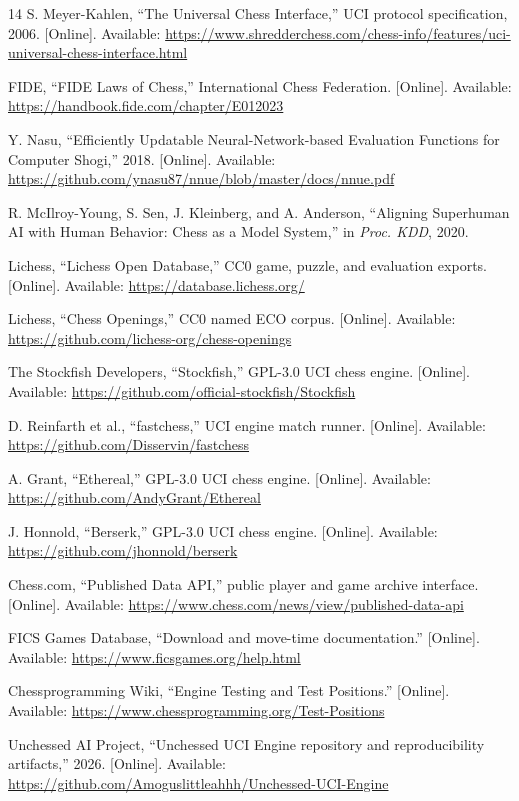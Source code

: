 \documentclass[conference]{IEEEtranSSP}
\begin{document}
\begin{thebibliography}{14}
S. Meyer-Kahlen, ``The Universal Chess Interface,'' UCI protocol specification, 2006. [Online]. Available: \url{https://www.shredderchess.com/chess-info/features/uci-universal-chess-interface.html}

FIDE, ``FIDE Laws of Chess,'' International Chess Federation. [Online]. Available: \url{https://handbook.fide.com/chapter/E012023}

Y. Nasu, ``Efficiently Updatable Neural-Network-based Evaluation Functions for Computer Shogi,'' 2018. [Online]. Available: \url{https://github.com/ynasu87/nnue/blob/master/docs/nnue.pdf}

R. McIlroy-Young, S. Sen, J. Kleinberg, and A. Anderson, ``Aligning Superhuman AI with Human Behavior: Chess as a Model System,'' in \emph{Proc. KDD}, 2020.

Lichess, ``Lichess Open Database,'' CC0 game, puzzle, and evaluation exports. [Online]. Available: \url{https://database.lichess.org/}

Lichess, ``Chess Openings,'' CC0 named ECO corpus. [Online]. Available: \url{https://github.com/lichess-org/chess-openings}

The Stockfish Developers, ``Stockfish,'' GPL-3.0 UCI chess engine. [Online]. Available: \url{https://github.com/official-stockfish/Stockfish}

D. Reinfarth et al., ``fastchess,'' UCI engine match runner. [Online]. Available: \url{https://github.com/Disservin/fastchess}

A. Grant, ``Ethereal,'' GPL-3.0 UCI chess engine. [Online]. Available: \url{https://github.com/AndyGrant/Ethereal}

J. Honnold, ``Berserk,'' GPL-3.0 UCI chess engine. [Online]. Available: \url{https://github.com/jhonnold/berserk}

Chess.com, ``Published Data API,'' public player and game archive interface. [Online]. Available: \url{https://www.chess.com/news/view/published-data-api}

FICS Games Database, ``Download and move-time documentation.'' [Online]. Available: \url{https://www.ficsgames.org/help.html}

Chessprogramming Wiki, ``Engine Testing and Test Positions.'' [Online]. Available: \url{https://www.chessprogramming.org/Test-Positions}

Unchessed AI Project, ``Unchessed UCI Engine repository and reproducibility artifacts,'' 2026. [Online]. Available: \url{https://github.com/Amoguslittleahhh/Unchessed-UCI-Engine}
\end{thebibliography}
\end{document}
